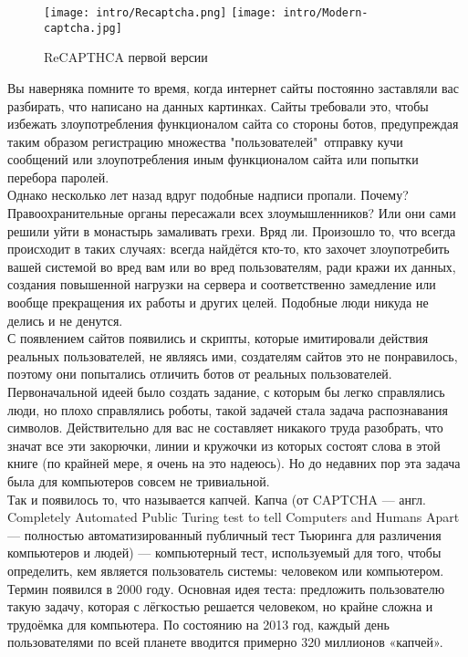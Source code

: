 \begin{wrapfigure}{l}{0.4\textwidth}
    \vspace{-0.5cm}
    \texttt{[image: intro/Recaptcha.png]}
    \texttt{[image: intro/Modern-captcha.jpg]}
    \caption{ReCAPTHCA первой версии}
    \label{fig:ReCAPTHCAv1}
\end{wrapfigure}

Вы наверняка помните то время, когда интернет сайты постоянно заставляли вас разбирать, что написано на данных картинках. Сайты требовали это, чтобы избежать злоупотребления функционалом сайта со стороны ботов, предупреждая таким образом регистрацию множества "пользователей"\, отправку кучи сообщений или злоупотребления иным функционалом сайта или попытки перебора паролей.\\

Однако несколько лет назад вдруг подобные надписи пропали. Почему? Правоохранительные органы пересажали всех злоумышленников? Или они сами решили уйти в монастырь замаливать грехи. Вряд ли. Произошло то, что всегда происходит в таких случаях: всегда найдётся кто-то, кто захочет злоупотребить вашей системой во вред вам или во вред пользователям, ради кражи их данных, создания повышенной нагрузки на сервера и соответственно замедление или вообще прекращения их работы и других целей. Подобные люди никуда не делись и не денутся.\\

С появлением сайтов появились и скрипты, которые имитировали действия реальных пользователей, не являясь ими, создателям сайтов это не понравилось, поэтому они попытались отличить ботов от реальных пользователей. Первоначальной идеей было создать задание, с которым бы легко справлялись люди, но плохо справлялись роботы, такой задачей стала задача распознавания символов. Действительно для вас не составляет никакого труда разобрать, что значат все эти закорючки, линии и кружочки из которых состоят слова в этой книге (по крайней мере, я очень на это надеюсь). Но до недавних пор эта задача была для компьютеров совсем не тривиальной.\\

Так и появилось то, что называется капчей. Капча (от CAPTCHA — англ. Completely Automated Public Turing test to tell Computers and Humans Apart — полностью автоматизированный публичный тест Тьюринга для различения компьютеров и людей) — компьютерный тест, используемый для того, чтобы определить, кем является пользователь системы: человеком или компьютером. Термин появился в 2000 году. Основная идея теста: предложить пользователю такую задачу, которая с лёгкостью решается человеком, но крайне сложна и трудоёмка для компьютера. По состоянию на 2013 год, каждый день пользователями по всей планете вводится примерно 320 миллионов «капчей». \cite{wiki:captcha_def}\\

